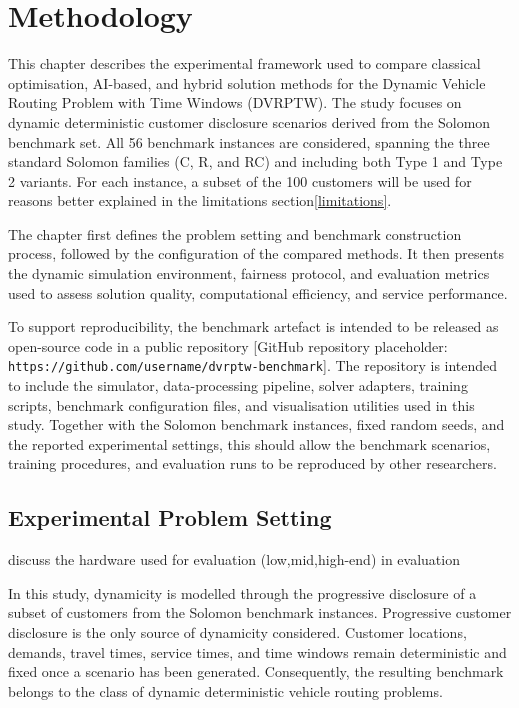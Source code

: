 

\chapter{Methodology}
\label{chp:methodology}

This chapter describes the experimental framework used to compare classical
optimisation, AI-based, and hybrid solution methods for the Dynamic Vehicle
Routing Problem with Time Windows (DVRPTW). The study focuses on dynamic
deterministic customer disclosure scenarios derived from the Solomon benchmark
set. All 56 benchmark instances are considered, spanning the three standard
Solomon families (C, R, and RC) and including both Type 1 and Type 2 variants.
For each instance, a subset of the 100 customers will be used for reasons better
explained in the limitations section\ref{limitations}.


The chapter first defines the problem setting and benchmark construction
process, followed by the configuration of the compared methods. It then presents
the dynamic simulation environment, fairness protocol, and evaluation metrics
used to assess solution quality, computational efficiency, and service
performance.

To support reproducibility, the benchmark artefact is intended to be released as
open-source code in a public repository [GitHub repository placeholder:
        \texttt{https://github.com/username/dvrptw-benchmark}]. The repository is
intended to include the simulator, data-processing pipeline, solver adapters,
training scripts, benchmark configuration files, and visualisation utilities
used in this study. Together with the Solomon benchmark instances, fixed random
seeds, and the reported experimental settings, this should allow the benchmark
scenarios, training procedures, and evaluation runs to be reproduced by other
researchers.


\section{Experimental Problem Setting}
{\color{red} discuss the hardware used for evaluation (low,mid,high-end) in
evaluation}

In this study, dynamicity is modelled through the progressive disclosure of a
subset of customers from the Solomon benchmark instances. Progressive customer
disclosure is the only source of dynamicity considered. Customer locations,
demands, travel times, service times, and time windows remain deterministic and
fixed once a scenario has been generated. Consequently, the resulting benchmark
belongs to the class of dynamic deterministic vehicle routing problems.
\cite{ojedariosRecentDynamicVehicle2021}

